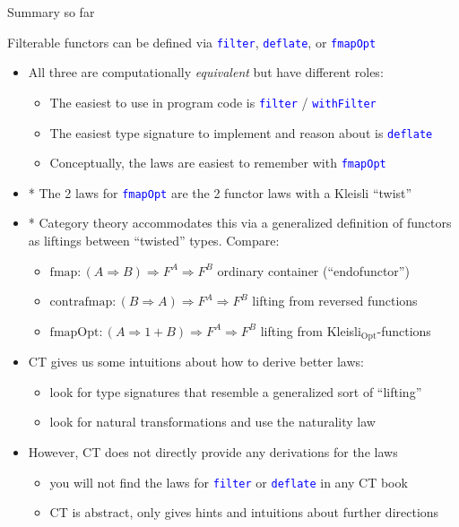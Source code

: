 \documentclass[english]{beamer}
\begin{document}
\begin{frame}{Summary so far}

Filterable functors can be defined via \texttt{\textcolor{blue}{\footnotesize{}filter}},
\texttt{\textcolor{blue}{\footnotesize{}deflate}}, or \texttt{\textcolor{blue}{\footnotesize{}fmapOpt}} 
\begin{itemize}
\item All three are computationally \emph{equivalent} but have different
roles:
\begin{itemize}
\item The easiest to use in program code is \texttt{\textcolor{blue}{\footnotesize{}filter}}
/ \texttt{\textcolor{blue}{\footnotesize{}withFilter}} 
\item The easiest type signature to implement and reason about is \texttt{\textcolor{blue}{\footnotesize{}deflate}} 
\item Conceptually, the laws are easiest to remember with \texttt{\textcolor{blue}{\footnotesize{}fmapOpt}} 
\end{itemize}
\item {*} The 2 laws for \texttt{\textcolor{blue}{\footnotesize{}fmapOpt}}
are the 2 functor laws with a Kleisli ``twist''
\item {*} Category theory accommodates this via a generalized definition
of functors as liftings between ``twisted'' types. Compare:
\begin{itemize}
\item $\text{fmap}:\left(A\Rightarrow B\right)\Rightarrow F^{A}\Rightarrow F^{B}$
\textendash{} ordinary container (``endofunctor'')
\item $\text{contrafmap}:\left(B\Rightarrow A\right)\Rightarrow F^{A}\Rightarrow F^{B}$
\textendash{} lifting from reversed functions
\item $\text{fmapOpt}:\left(A\Rightarrow1+B\right)\Rightarrow F^{A}\Rightarrow F^{B}$
\textendash{} lifting from Kleisli$_{\text{Opt}}$-functions 
\end{itemize}
\item CT gives us some intuitions about how to derive better laws:
\begin{itemize}
\item look for type signatures that resemble a generalized sort of ``lifting''
\item look for natural transformations and use the naturality law
\end{itemize}
\item However, CT does not directly provide any derivations for the laws
\begin{itemize}
\item you will not find the laws for \texttt{\textcolor{blue}{\footnotesize{}filter}}
or \texttt{\textcolor{blue}{\footnotesize{}deflate}} in any CT book
\item CT is abstract, only gives hints and intuitions about further directions
\end{itemize}
\end{itemize}
\end{frame}
\end{document}
